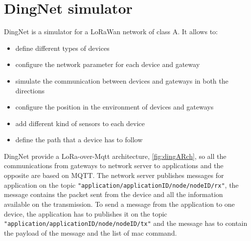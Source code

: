 \section{DingNet simulator}
DingNet is a simulator for a LoRaWan network of class A. It allows to:
\begin{itemize}
    \item define different types of devices
    \item configure the network parameter for each device and gateway
    \item simulate the communication between devices and gateways in both the directions
    \item configure the position in the environment of devices and gateways
    \item add different kind of sensors to each device 
    \item define the path that a device has to follow
\end{itemize}
DingNet provide a LoRa-over-Mqtt architecture, \autoref{fig:dingARch}, so all the communications from gateways to network server to applications and the opposite are based on MQTT. The network server publishes messages for application on the topic \texttt{"application/applicationID/node/nodeID/rx"}, the message contains the packet sent from the device and all the information available on the transmission. To send a message from the application to one device, the application has to publishes it on the topic \mbox{\texttt{"application/applicationID/node/nodeID/tx"}} and the message has to contain the payload of the message and the list of mac command.

